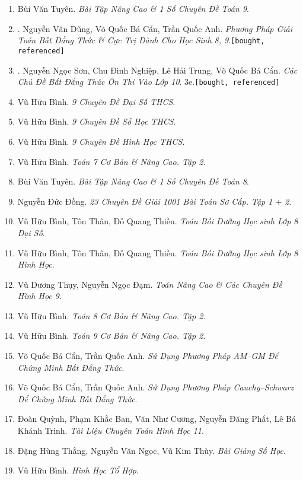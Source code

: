 \documentclass{article}
\numberwithin{equation}{section}
\begin{document}
\begin{enumerate}
	\item Bùi Văn Tuyên. \textit{Bài Tập Nâng Cao \& 1 Số Chuyên Đề Toán 9}.
	\item \cite{Dung_Can_Anh2020}. Nguyễn Văn Dũng, Võ Quốc Bá Cẩn, Trần Quốc Anh. \textit{Phương Pháp Giải Toán Bất Đẳng Thức \& Cực Trị Dành Cho Học Sinh 8, 9}.\hfill\texttt{[bought, referenced]}
	\item \cite{Son_Nghiep_Trung_Can2021}. Nguyễn Ngọc Sơn, Chu Đình Nghiệp, Lê Hải Trung, Võ Quốc Bá Cẩn. \textit{Các Chủ Đề Bất Đẳng Thức Ôn Thi Vào Lớp 10}. 3e.\hfill\texttt{[bought, referenced]}
	\item Vũ Hữu Bình. \textit{9 Chuyên Đề Đại Số THCS}.
	\item Vũ Hữu Bình. \textit{9 Chuyên Đề Số Học THCS}.
	\item Vũ Hữu Bình. \textit{9 Chuyên Đề Hình Học THCS}.
	\item Vũ Hữu Bình. \textit{Toán 7 Cơ Bản \& Nâng Cao. Tập 2}.
	\item Bùi Văn Tuyên. \textit{Bài Tập Nâng Cao \& 1 Số Chuyên Đề Toán 8}.
	\item Nguyễn Đức Đồng. \textit{23 Chuyên Đề Giải 1001 Bài Toán Sơ Cấp. Tập 1 $+$ 2}.
	\item Vũ Hữu Bình, Tôn Thân, Đỗ Quang Thiều. \textit{Toán Bồi Dưỡng Học sinh Lớp 8 Đại Số}.
	\item Vũ Hữu Bình, Tôn Thân, Đỗ Quang Thiều. \textit{Toán Bồi Dưỡng Học sinh Lớp 8 Hình Học}.
	\item Vũ Dương Thụy, Nguyễn Ngọc Đạm. \textit{Toán Nâng Cao \& Các Chuyên Đề Hình Học 9}.
	\item Vũ Hữu Bình. \textit{Toán 8 Cơ Bản \& Nâng Cao. Tập 2}.
	\item Vũ Hữu Bình. \textit{Toán 9 Cơ Bản \& Nâng Cao. Tập 2}.
	\item Võ Quốc Bá Cẩn, Trần Quốc Anh. \textit{Sử Dụng Phương Pháp AM--GM Để Chứng Minh Bất Đẳng Thức}.
	\item Võ Quốc Bá Cẩn, Trần Quốc Anh. \textit{Sử Dụng Phương Pháp Cauchy--Schwarz Để Chứng Minh Bất Đẳng Thức}.
	\item Đoàn Quỳnh, Phạm Khắc Ban, Văn Như Cương, Nguyễn Đăng Phất, Lê Bá Khánh Trình. \textit{Tài Liệu Chuyên Toán Hình Học 11}.
	\item Đặng Hùng Thắng, Nguyễn Văn Ngọc, Vũ Kim Thùy. \textit{Bài Giảng Số Học}.
	\item Vũ Hữu Bình. \textit{Hình Học Tổ Hợp}.
\end{enumerate}
\end{document}
